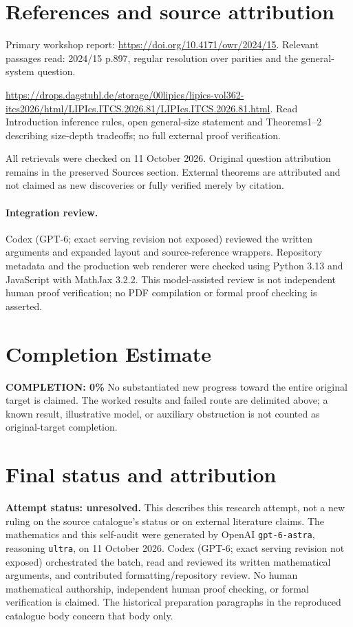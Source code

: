 \documentclass[11pt]{article}
\begin{document}
\section{References and source attribution}
Primary workshop report: \url{https://doi.org/10.4171/owr/2024/15}. Relevant passages read: 2024/15 p.897, regular resolution over parities and the general-system question.

\url{https://drops.dagstuhl.de/storage/00lipics/lipics-vol362-itcs2026/html/LIPIcs.ITCS.2026.81/LIPIcs.ITCS.2026.81.html}. Read Introduction inference rules, open general-size statement and Theorems1--2 describing size-depth tradeoffs; no full external proof verification.

All retrievals were checked on 11 October 2026. Original question attribution remains in the preserved Sources section. External theorems are attributed and not claimed as new discoveries or fully verified merely by citation.


\paragraph{Integration review.} Codex (GPT-6; exact serving revision not exposed) reviewed the written arguments and expanded layout and source-reference wrappers. Repository metadata and the production web renderer were checked using Python 3.13 and JavaScript with MathJax 3.2.2. This model-assisted review is not independent human proof verification; no PDF compilation or formal proof checking is asserted.

\section{Completion Estimate}
\noindent\textbf{COMPLETION: 0\%}
No substantiated new progress toward the entire original target is claimed. The worked results and failed route are delimited above; a known result, illustrative model, or auxiliary obstruction is not counted as original-target completion.

\section{Final status and attribution}
\textbf{Attempt status: unresolved.} This describes this research attempt, not a new ruling on the source catalogue's status or on external literature claims.
The mathematics and this self-audit were generated by OpenAI \texttt{gpt-6-astra}, reasoning \texttt{ultra}, on 11 October 2026. Codex (GPT-6; exact serving revision not exposed) orchestrated the batch, read and reviewed its written mathematical arguments, and contributed formatting/repository review. No human mathematical authorship, independent human proof checking, or formal verification is claimed. The historical preparation paragraphs in the reproduced catalogue body concern that body only.
\end{document}
